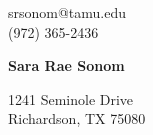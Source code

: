 \documentclass[12pt]{article}
\begin{document}

\noindent
\begin{minipage}{0.25\linewidth}
\begin{flushleft}
srsonom@tamu.edu\\
(972) 365-2436\\
\end{flushleft}
\end{minipage}
\hfill
\begin{minipage}{0.4\linewidth}
\begin{center}
{\Huge\textbf{Sara Rae Sonom}}
\end{center}
\end{minipage}
\hfill
\begin{minipage}{0.25\linewidth}
\begin{flushright}
1241 Seminole Drive\\
Richardson, TX 75080 \\
\end{flushright}
\end{minipage}
\vspace{-4px}
\end{document}

